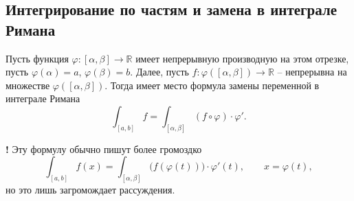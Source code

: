 \subsection{Интегрирование по частям и замена в интеграле Римана}

\begin{theorem}
Пусть функция $\varphi:[\alpha, \beta] \to \mathbb{R}$ имеет непрерывную производную на этом отрезке, пусть $\varphi(\alpha) = a$, $\varphi(\beta) = b$. Далее, пусть $f: \varphi([\alpha, \beta]) \to \mathbb{R}$ -- непрерывна на множестве $\varphi([\alpha,\beta])$. Тогда имеет место формула замены переменной в интеграле Римана
\[
 \int_{[a,b]} f = \int_{[\alpha, \beta]} (f\circ \varphi) \cdot \varphi'.
\]
\end{theorem}
\begin{mydanger}{\bf !}
 Эту формулу обычно пишут более громоздко
\[
 \int_{[a,b]} f(x) = \int_{[\alpha, \beta]} \bigl( f(\varphi(t))\bigr)\cdot \varphi'(t), \qquad x = \varphi(t),
\]
но это лишь загромождает рассуждения.
\end{mydanger}
